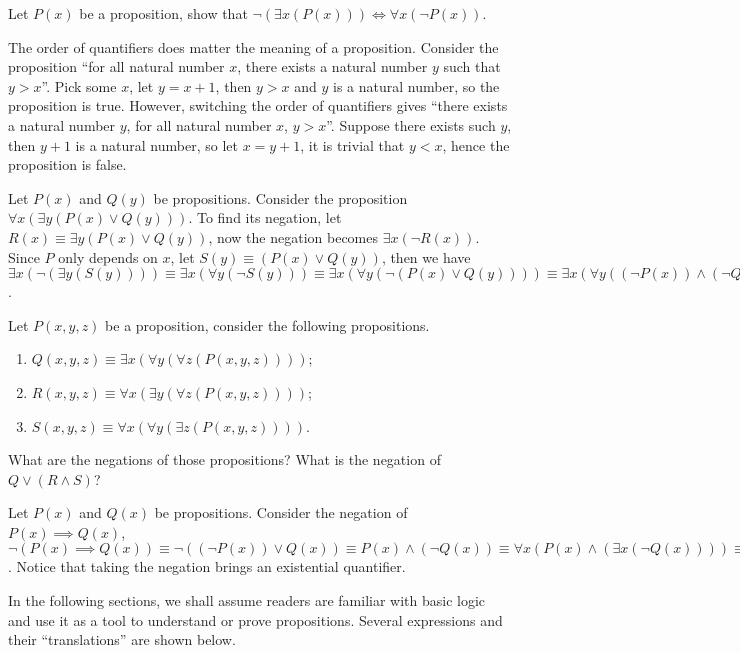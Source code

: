 \documentclass[10pt]{article}
\begin{document}
\begin{problem}
    Let $P(x)$ be a proposition, show that $\neg(\exists x(P(x)))\iff\forall x(\neg P(x))$.
\end{problem}
\par
The order of quantifiers does matter the meaning of a proposition. Consider the proposition ``for all natural number $x$, there exists a natural number $y$ such that $y>x$''. Pick some $x$, let $y=x+1$, then $y>x$ and $y$ is a natural number, so the proposition is true. However, switching the order of quantifiers gives ``there exists a natural number $y$, for all natural number $x$, $y>x$''. Suppose there exists such $y$, then $y+1$ is a natural number, so let $x=y+1$, it is trivial that $y<x$, hence the proposition is false.
\begin{example}
    Let $P(x)$ and $Q(y)$ be propositions. Consider the proposition $\forall x(\exists y(P(x)\vee Q(y)))$. To find its negation, let $R(x)\equiv\exists y(P(x)\vee Q(y))$, now the negation becomes $\exists x(\neg R(x))$. Since $P$ only depends on $x$, let $S(y)\equiv(P(x)\vee Q(y))$, then we have $\exists x(\neg(\exists y(S(y))))\equiv\exists x(\forall y(\neg S(y)))\equiv\exists x(\forall y(\neg(P(x)\vee Q(y))))\equiv\exists x(\forall y((\neg P(x))\wedge(\neg Q(y))))$.
\end{example}
\begin{problem}
    Let $P(x,y,z)$ be a proposition, consider the following propositions.
    \begin{enumerate}
        \item $Q(x,y,z)\equiv\exists x(\forall y(\forall z(P(x,y,z))))$; %
        \item $R(x,y,z)\equiv\forall x(\exists y(\forall z(P(x,y,z))))$;
        \item $S(x,y,z)\equiv\forall x(\forall y(\exists z(P(x,y,z))))$.
    \end{enumerate}
    What are the negations of those propositions? What is the negation of $Q\vee(R\wedge S)$?
\end{problem}
\begin{example}
    Let $P(x)$ and $Q(x)$ be propositions. Consider the negation of $P(x)\implies Q(x)$, $\neg(P(x)\implies Q(x))\equiv\neg((\neg P(x))\vee Q(x))\equiv P(x)\wedge(\neg Q(x))\equiv\forall x(P(x)\wedge(\exists x(\neg Q(x))))\equiv\exists x(P(x)\wedge(\neg Q(x)))$. Notice that taking the negation brings an existential quantifier.
\end{example}
\par
In the following sections, we shall assume readers are familiar with basic logic and use it as a tool to understand or prove propositions. Several expressions and their “translations” are shown below.
\end{document}
